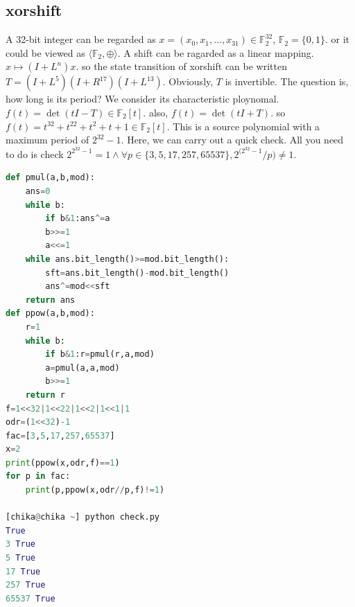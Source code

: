 \documentclass[10pt,a4paper]{article}
\begin{document}
\subsection{xorshift}
A 32-bit integer can be regarded as $x=(x_0,x_1,\dots,x_31)\in\mathbb{F}_2^{32}$, $\mathbb{F}_2=\{0,1\}$.
or it could be viewed as $\langle\mathbb{F}_2,\oplus\rangle$. A shift can be ragarded as a linear mapping.
$x\mapsto(I+L^n)x$. so the state transition of xorshift can be written $T=(I+L^5)(I+R^{17})(I+L^{13})$. Obviously, 
$T$ is invertible. The question is, how long is its period? We consider its characteristic ploynomal. $f(t)=\det(tI-T)\in\mathbb{F}_2[t]$. also, $f(t)=\det(tI+T)$. so $f(t)=t^{32}+t^{22}+t^2+t+1\in\mathbb{F}_2[t]$. This is a source 
polynomial with a maximum period of $2^{32}-1$. Here, we can carry out a quick check. All you need to do is check 
$2^{2^{32}-1}=1\land\forall p\in\{3,5,17,257,65537\},2^{(2^{32}-1}/p)\ne1$.
\begin{lstlisting}[language=Python]
def pmul(a,b,mod):
    ans=0
    while b:
        if b&1:ans^=a
        b>>=1
        a<<=1
    while ans.bit_length()>=mod.bit_length():
        sft=ans.bit_length()-mod.bit_length()
        ans^=mod<<sft
    return ans
def ppow(a,b,mod):
    r=1
    while b:
        if b&1:r=pmul(r,a,mod)
        a=pmul(a,a,mod)
        b>>=1
    return r
f=1<<32|1<<22|1<<2|1<<1|1
odr=(1<<32)-1
fac=[3,5,17,257,65537]
x=2
print(ppow(x,odr,f)==1)
for p in fac:
    print(p,ppow(x,odr//p,f)!=1)

[chika@chika ~] python check.py
True
3 True
5 True
17 True
257 True
65537 True
\end{lstlisting}
\end{document}
